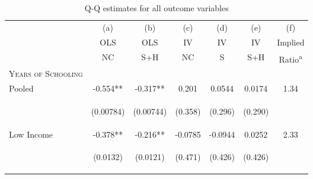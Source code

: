 \documentclass{article}[11pt,subeqn]
\begin{document}
\begin{spacing}{1.5}
\begin{table}														
\caption{Q-Q estimates for all outcome variables}														
\vspace{-3mm}														
\label{tab:fertilityALL}														
\begin{center}														
\begin{tabular}{lcccccc} \toprule														
& (a) & (b) & (c) & (d) & (e) & (f)\\														
& OLS & OLS & IV & IV & IV & Implied \\														
& NC & S+H & NC & S & S+H & Ratio\textsuperscript{a} \\														
\midrule														
\textsc{Years of Schooling} & & & & & &\\														
Pooled &		-0.554**	&	-0.317**	&	0.201	&	0.0544	&	0.0174	&	1.34		\\
\vspace{4pt} &	\begin{footnotesize}	(0.00784)	\end{footnotesize} & \begin{footnotesize}	(0.00744)	\end{footnotesize} & \begin{footnotesize}	(0.358)	\end{footnotesize} & \begin{footnotesize}	(0.296)	\end{footnotesize} & \begin{footnotesize}	(0.290)	\end{footnotesize} & \begin{footnotesize}		\end{footnotesize}	\\
Low Income &		-0.378**	&	-0.216**	&	-0.0785	&	-0.0944	&	0.0252	&	2.33		\\
\vspace{4pt} &	\begin{footnotesize}	(0.0132)	\end{footnotesize} & \begin{footnotesize}	(0.0121)	\end{footnotesize} & \begin{footnotesize}	(0.471)	\end{footnotesize} & \begin{footnotesize}	(0.426)	\end{footnotesize} & \begin{footnotesize}	(0.426)	\end{footnotesize} & \begin{footnotesize}		\end{footnotesize}	\\

\end{tabular}
\end{center}
\end{table}
\end{spacing}
\end{document}
